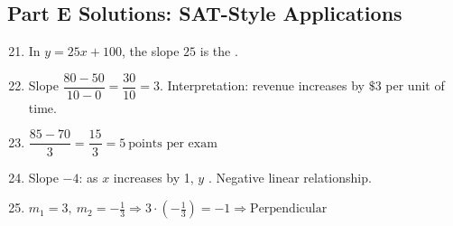 \documentclass[14pt]{extarticle}
\begin{document}
\subsection*{Part E Solutions: SAT-Style Applications}
\begin{enumerate}
    \setcounter{enumi}{20}
    \item In \(y=25x+100\), the slope \(25\) is the .
    \item Slope \(\dfrac{80-50}{10-0}=\dfrac{30}{10}=\boxed{3}\). Interpretation: revenue increases by \(\$3\) per unit of time.
    \item \(\dfrac{85-70}{3}=\dfrac{15}{3}=\boxed{5\ \text{points per exam}}\)
    \item Slope \(-4\): as \(x\) increases by 1, \(y\) . Negative linear relationship.
    \item \(m_1=3,\ m_2=-\tfrac{1}{3}\Rightarrow 3\cdot(-\tfrac{1}{3})=-1\Rightarrow\boxed{\text{Perpendicular}}\)
\end{enumerate}






\end{document}
